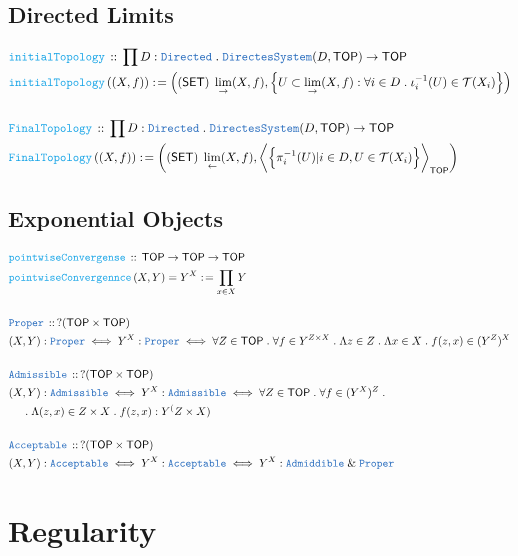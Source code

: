 \documentclass[12pt]{scrartcl}
\newcommand{\TYPE}[1]{\textcolor{NavyBlue}{\mathtt{#1}}}
\newcommand{\FUNC}[1]{\textcolor{Cerulean}{\mathtt{#1}}}
\renewcommand{\.}{\; . \;}
\newcommand{\de}{: \kern 0.1pc =}
\newcommand{\Act}[1]{\left( #1 \right)}
\newcommand{\DeclareType}[2]{& \TYPE{#1} \, :: \, #2 \\}
\newcommand{\DefineNamedType}[4]{& #1 : \TYPE{#2} \iff #3 \iff #4 \\}
\newcommand{\DeclareFunc}[2]{& \FUNC{#1} \, :: \, #2 \\}
\newcommand{\DefineFunc}[3]{&  \FUNC{#1}\Act{#2} \de #3 \\}
\newcommand{\DefineNamedFunc}[4]{&  \FUNC{#1}\Act{#2} = #3 \de #4 \\}
\newcommand{\NewLine}{\\ & \kern 1pc}
\newcommand{\Page}[1]{ \begin{align*} #1 \end{align*}   }
\renewcommand{\And}{\; \& \;}
\newcommand{\SET}{\mathsf{SET}}
\newcommand{\TOP}{\mathsf{TOP}}
\newcommand{\T}{\mathcal{T}}
\begin{document}
\subsection{Directed Limits}
\Page{
	\DeclareFunc{initialTopology}
	{
		\prod D : \TYPE{Directed} \. 
		\TYPE{DirectesSystem}(D,\TOP) \to \TOP
	}
	\DefineFunc{initialTopology}{(X,f)}{
		\Act{ (\SET) \; \lim_{\to} (X,f)  , 
		\Big\{ U \subset \lim_{\to} (X,f) : \forall i \in D \. \iota_i^{-1}(U) \in \T(X_i)   \Big\}   }  
	}
	\\
	\DeclareFunc{FinalTopology}
	{
		\prod D : \TYPE{Directed} \. 
		\TYPE{DirectesSystem}(D,\TOP) \to \TOP
	}
	\DefineFunc{FinalTopology}{(X,f)}{
		\Act{ (\SET) \; \lim_{\leftarrow} (X,f)  , 
		\bigg\langle \Big\{ \pi_i^{-1}(U) | i \in D, U \in \T(X_i)  \Big\} \bigg\rangle_\TOP  }  
	}
}
\newpage
\subsection{Exponential Objects}
\Page{
	\DeclareFunc{pointwiseConvergense}{\TOP \to \TOP \to \TOP}
	\DefineNamedFunc{pointwiseConvergennce}
	{X,Y}{Y^X}{\prod_{x \in X} Y}
	\\
	\DeclareType{Proper}{?(\TOP \times \TOP)}
	\DefineNamedType{(X,Y)}{Proper}{ Y^X : \TYPE{Proper} }
	{
		\forall Z \in \TOP \. 
		\forall f \in Y^{Z \times X} \. 
		\Lambda z \in Z \. \Lambda x \in X \. f(z,x) \in (Y^Z)^X
	}
	\\
	\DeclareType{Admissible}{?(\TOP \times \TOP)}
	\DefineNamedType{(X,Y)}{Admissible}{Y^X : \TYPE{Admissible}}
	{
		\forall Z \in \TOP \.
		\forall f \in   (Y^X)^Z \. \NewLine \. 
		\Lambda (z,x) \in Z \times X \. f(z,x) : Y^(Z \times X)
	}
	\\
	\DeclareType{Acceptable}{?(\TOP \times \TOP)}
	\DefineNamedType{(X,Y)}{Acceptable}{Y^X : \TYPE{Acceptable}}
	{
		Y^X : \TYPE{Admiddible} \And \TYPE{Proper} 
	}
}
\newpage
\section{Regularity}
\end{document}
